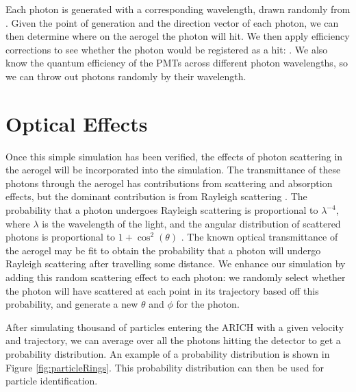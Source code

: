 Each photon is generated with a corresponding wavelength, drawn randomly from . 
Given the point of generation and the direction vector of each photon, we can then determine where on the aerogel the photon will hit.
We then apply efficiency corrections to see whether the photon would be registered as a hit: .
We also know the quantum efficiency of the PMTs across different photon wavelengths, so we can throw out photons randomly by their wavelength.

\section{Optical Effects}

Once this simple simulation has been verified, the effects of photon scattering in the aerogel will be incorporated into the simulation.
The transmittance of these photons through the aerogel has contributions from scattering and absorption effects, but the dominant contribution is from Rayleigh scattering \cite{aerogelRefraction}.
The probability that a photon  undergoes Rayleigh scattering is proportional to $\lambda^{-4}$, where $\lambda$ is the wavelength of the light, and the angular distribution of scattered photons is proportional to $1 + \cos^2(\theta)$ \cite{rayleigh}.
The known optical transmittance of the aerogel \cite{aerogelRefraction} may be fit to obtain the probability that a photon will undergo Rayleigh scattering after travelling some distance.
We enhance our simulation by adding this random scattering effect to each photon: we randomly select whether the photon will have scattered at each point in its trajectory based off this probability, and generate a new $\theta$ and $\phi$ for the photon. 

After simulating thousand of particles entering the \ac{ARICH} with a given velocity and trajectory, we can average over all the photons hitting the detector to get a probability distribution.
An example of a probability distribution is shown in Figure \ref{fig:particleRings}.
This probability distribution can then be used for particle identification.

